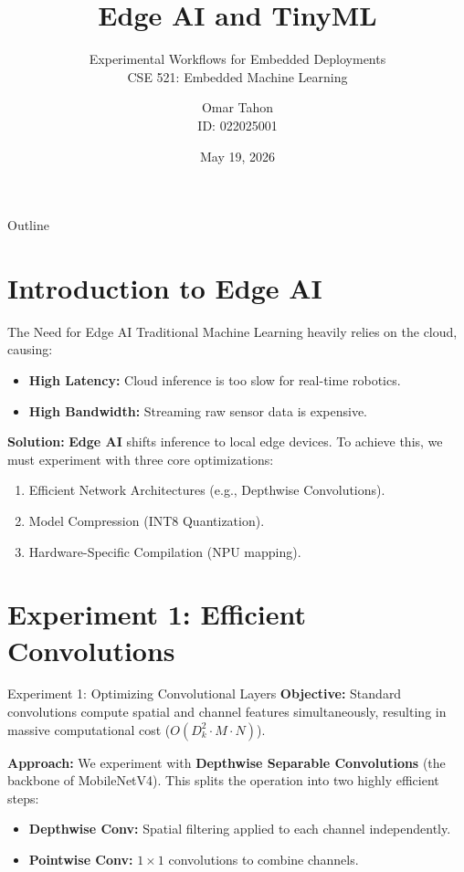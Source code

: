\documentclass[aspectratio=169]{beamer}
\title[Edge AI Experiments]{Edge AI and TinyML}
\subtitle{Experimental Workflows for Embedded Deployments\\ CSE 521: Embedded Machine Learning}
\author{Omar Tahon\\ID: 022025001}
\date{May 19, 2026}
\begin{document}
\begin{frame}
    \titlepage
\end{frame}

\begin{frame}{Outline}
    \tableofcontents
\end{frame}

\section{Introduction to Edge AI}

\begin{frame}{The Need for Edge AI}
    Traditional Machine Learning heavily relies on the cloud, causing:
    \begin{itemize}
        \item \textbf{High Latency:} Cloud inference is too slow for real-time robotics.
        \item \textbf{High Bandwidth:} Streaming raw sensor data is expensive.
    \end{itemize}
    
    \vspace{0.3cm}
    \textbf{Solution:} \textbf{Edge AI} shifts inference to local edge devices. To achieve this, we must experiment with three core optimizations:
    \begin{enumerate}
        \item Efficient Network Architectures (e.g., Depthwise Convolutions).
        \item Model Compression (INT8 Quantization).
        \item Hardware-Specific Compilation (NPU mapping).
    \end{enumerate}
\end{frame}

\section{Experiment 1: Efficient Convolutions}

\begin{frame}{Experiment 1: Optimizing Convolutional Layers}
    \textbf{Objective:} Standard convolutions compute spatial and channel features simultaneously, resulting in massive computational cost ($O(D_k^2 \cdot M \cdot N)$).
    
    \vspace{0.3cm}
    \textbf{Approach:} We experiment with \textbf{Depthwise Separable Convolutions} (the backbone of MobileNetV4). This splits the operation into two highly efficient steps:
    \begin{itemize}
        \item \textbf{Depthwise Conv:} Spatial filtering applied to each channel independently.
        \item \textbf{Pointwise Conv:} $1 \times 1$ convolutions to combine channels.
    \end{itemize}
\end{frame}
\end{document}
